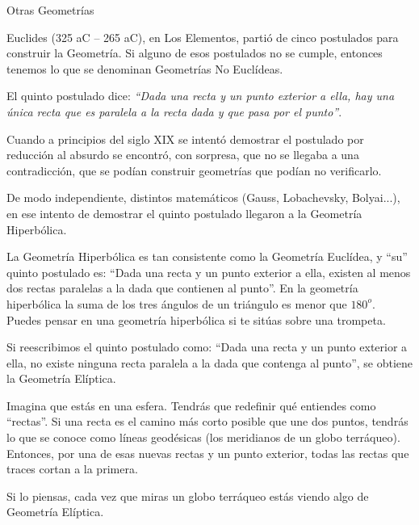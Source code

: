 \begin{myexampleblock}{Otras Geometrías}
	
\small{Euclides} (325 aC – 265 aC), en Los Elementos, partió de cinco postulados para construir la Geometría. Si alguno de esos postulados no se cumple, entonces tenemos lo que se denominan Geometrías No Euclídeas.
 
\vspace{2mm} El quinto postulado dice: \textit{“Dada una recta y un punto exterior a ella, hay una única recta que es paralela a la recta dada y que pasa por el punto”}. 

\vspace{2mm}Cuando a principios del siglo XIX se intentó demostrar el postulado por reducción al absurdo se encontró, con sorpresa, que no se llegaba a una contradicción, que se podían construir geometrías que podían no verificarlo. 

\vspace{2mm}De modo independiente, distintos matemáticos (Gauss, Lobachevsky, Bolyai...), en ese intento de demostrar el quinto postulado llegaron a la Geometría Hiperbólica. 

\vspace{2mm}La Geometría Hiperbólica es tan consistente como la Geometría Euclídea, y “su” quinto postulado es: “Dada una recta y un punto exterior a ella, existen al menos dos rectas paralelas a la dada que contienen al punto”. En la geometría hiperbólica la suma de los tres ángulos de un triángulo es menor que $180^o$. Puedes pensar en una geometría hiperbólica si te sitúas sobre una trompeta. 

\vspace{2mm}Si reescribimos el quinto postulado como: “Dada una recta y un punto exterior a ella, no existe ninguna recta paralela a la dada que contenga al punto”, se obtiene la Geometría Elíptica. 

\vspace{2mm}Imagina que estás en una esfera. Tendrás que redefinir qué entiendes como “rectas”. Si una recta es el camino más corto posible que une dos puntos, tendrás lo que se conoce como líneas geodésicas (los meridianos de un globo terráqueo). Entonces, por una de esas nuevas rectas y un punto exterior, todas las rectas que traces cortan a la primera. 

\vspace{2mm}Si lo piensas, cada vez que miras un globo terráqueo estás viendo algo de Geometría Elíptica. 


\end{myexampleblock}
